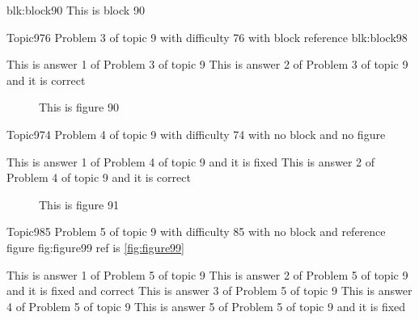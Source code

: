 \documentclass[master]{exam}
\begin{document}
\begin{block}{blk:block90}
This is block 90
\end{block}


\begin{problem}[requires=blk:block98]{Topic9}{76}
	Problem 3 of topic 9 with difficulty 76 with block reference blk:block98
	\begin{answers}
		\answer This is answer 1 of Problem 3 of topic 9 
		\answer[correct] This is answer 2 of Problem 3 of topic 9 and it is correct
	\end{answers}
\end{problem}



\begin{figure}
	\begin{center}
		This is figure 90 
		\label{fig:figure90}
	\end{center}
\end{figure}

\begin{problem}{Topic9}{74}
	Problem 4 of topic 9 with difficulty 74 with no block and no figure
	\begin{answers}
		\answer[fixed] This is answer 1 of Problem 4 of topic 9 and it is fixed
		\answer[correct] This is answer 2 of Problem 4 of topic 9 and it is correct
	\end{answers}
\end{problem}



\begin{figure}
	\begin{center}
		This is figure 91 
		\label{fig:figure91}
	\end{center}
\end{figure}

\begin{problem}{Topic9}{85}
	Problem 5 of topic 9 with difficulty 85 with no block and reference figure fig:figure99 ref is \ref{fig:figure99}
	\begin{answers}
		\answer This is answer 1 of Problem 5 of topic 9 
		 This is answer 2 of Problem 5 of topic 9 and it is fixed and correct
		\answer This is answer 3 of Problem 5 of topic 9 
		\answer This is answer 4 of Problem 5 of topic 9 
		\answer[fixed] This is answer 5 of Problem 5 of topic 9 and it is fixed
	\end{answers}
\end{problem}
\end{document}
